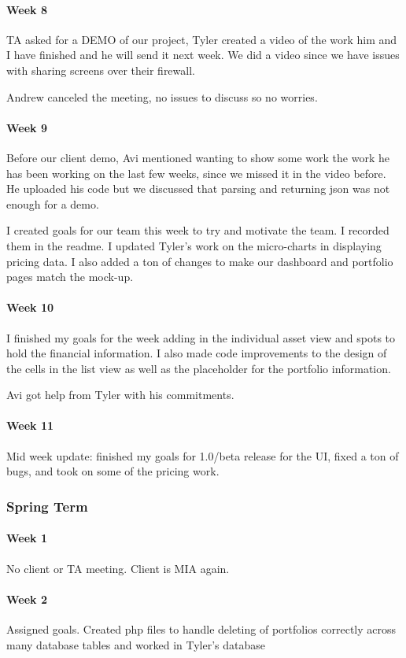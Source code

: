 \documentclass[onecolumn, draftclsnofoot,10pt, compsoc]{IEEEtran}
\begin{document}
\paragraph{Week 8}
    TA asked for a DEMO of our project, Tyler created a video of the work him and I have finished and 
    he will send it next week. We did a video since we have issues with sharing screens over their firewall.

    Andrew canceled the meeting, no issues to discuss so no worries. 
\paragraph{Week 9}
    Before our client demo, Avi mentioned wanting to show some work the work he has been working on the last
    few weeks, since we missed it in the video before. He uploaded his code but we discussed that parsing 
    and returning json was not enough for a demo.        
    
    I created goals for our team this week to try and motivate the team. I recorded them in the readme.
    I updated Tyler's work on the micro-charts in displaying pricing data. I also added a ton of changes to make our
    dashboard and portfolio pages match the mock-up.
\paragraph{Week 10}
    I finished my goals for the week adding in the individual asset view and spots to hold the 
    financial information. I also made code improvements to the design of the cells in the list 
    view as well as the placeholder for the portfolio information.

    Avi got help from Tyler with his commitments. 
\paragraph{Week 11}
    Mid week update: finished my goals for 1.0/beta release for the UI, fixed a ton of bugs, and took on some of
    the pricing work.

\subsubsection{Spring Term}
\paragraph{Week 1}
No client or TA meeting. Client is MIA again.
\paragraph{Week 2}
Assigned goals. Created php files to handle deleting of portfolios correctly across many database tables and worked in Tyler's database
\end{document}
